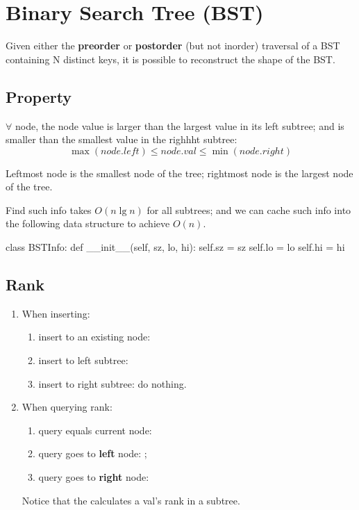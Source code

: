 \section{Binary Search Tree (BST)}
Given either the \textbf{preorder} or \textbf{postorder} (but not inorder) traversal of a BST containing N distinct keys, it is possible to reconstruct the shape of the BST. 
\subsection{Property} $\forall$ node, the node value is larger than the largest value in its left subtree; and is smaller than the smallest value in the righhht subtree:
$$
\max(node.left) \leq node.val \leq \min(node.right)
$$

Leftmost node is the smallest node of the tree; rightmost node is the largest node of the tree.

Find such info takes $O(n\lg n)$ for all subtrees; and we can cache such info into the following data structure to achieve $O(n)$.

\begin{python}
class BSTInfo:
    def __init__(self, sz, lo, hi):
        self.sz = sz
        self.lo = lo
        self.hi = hi
\end{python}
\subsection{Rank}
\begin{enumerate}
\item When inserting: 
  \begin{enumerate}
  \item insert to an existing node: 
  \item insert to left subtree: 
  \item insert to right subtree: do nothing. 
\end{enumerate}
\item When querying rank:
  \begin{enumerate}
  \item query equals current node: 
  \item query goes to \textbf{left} node: ;
  \item query goes to \textbf{right} node:  
  \end{enumerate}
Notice that the  calculates a val's rank in a subtree.
\end{enumerate}

